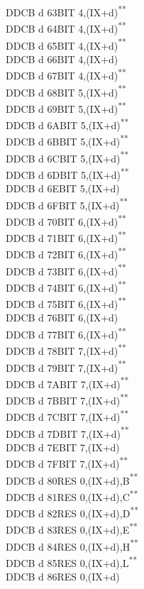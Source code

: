 \documentclass[12pt,twoside,openright,a4paper]{book}
\newcommand{\UNDOC}{\textnormal{\textsuperscript{**}}}
\begin{document}
\begin{multicols}{3}
{\begin{tabbing}
	DDCB d 63\>BIT 4,(IX+d)\UNDOC\\
	DDCB d 64\>BIT 4,(IX+d)\UNDOC\\
	DDCB d 65\>BIT 4,(IX+d)\UNDOC\\
	DDCB d 66\>BIT 4,(IX+d)\\
	DDCB d 67\>BIT 4,(IX+d)\UNDOC\\
	DDCB d 68\>BIT 5,(IX+d)\UNDOC\\
	DDCB d 69\>BIT 5,(IX+d)\UNDOC\\
	DDCB d 6A\>BIT 5,(IX+d)\UNDOC\\
	DDCB d 6B\>BIT 5,(IX+d)\UNDOC\\
	DDCB d 6C\>BIT 5,(IX+d)\UNDOC\\
	DDCB d 6D\>BIT 5,(IX+d)\UNDOC\\
	DDCB d 6E\>BIT 5,(IX+d)\\
	DDCB d 6F\>BIT 5,(IX+d)\UNDOC\\
	DDCB d 70\>BIT 6,(IX+d)\UNDOC\\
	DDCB d 71\>BIT 6,(IX+d)\UNDOC\\
	DDCB d 72\>BIT 6,(IX+d)\UNDOC\\
	DDCB d 73\>BIT 6,(IX+d)\UNDOC\\
	DDCB d 74\>BIT 6,(IX+d)\UNDOC\\
	DDCB d 75\>BIT 6,(IX+d)\UNDOC\\
	DDCB d 76\>BIT 6,(IX+d)\\
	DDCB d 77\>BIT 6,(IX+d)\UNDOC\\
	DDCB d 78\>BIT 7,(IX+d)\UNDOC\\
	DDCB d 79\>BIT 7,(IX+d)\UNDOC\\
	DDCB d 7A\>BIT 7,(IX+d)\UNDOC\\
	DDCB d 7B\>BIT 7,(IX+d)\UNDOC\\
	DDCB d 7C\>BIT 7,(IX+d)\UNDOC\\
	DDCB d 7D\>BIT 7,(IX+d)\UNDOC\\
	DDCB d 7E\>BIT 7,(IX+d)\\
	DDCB d 7F\>BIT 7,(IX+d)\UNDOC\\
	DDCB d 80\>RES 0,(IX+d),B\UNDOC\\
	DDCB d 81\>RES 0,(IX+d),C\UNDOC\\
	DDCB d 82\>RES 0,(IX+d),D\UNDOC\\
	DDCB d 83\>RES 0,(IX+d),E\UNDOC\\
	DDCB d 84\>RES 0,(IX+d),H\UNDOC\\
	DDCB d 85\>RES 0,(IX+d),L\UNDOC\\
	DDCB d 86\>RES 0,(IX+d)\\

\end{tabbing}}
\end{multicols}
\end{document}
